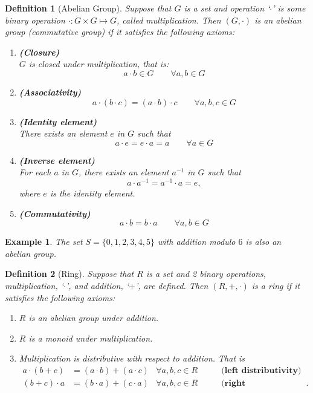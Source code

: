 \documentclass[12pt]{article}
\newtheorem{example}{Example}
\newtheorem{definition}{Definition}
\begin{document}
\begin{definition}[Abelian Group]
	Suppose that $G$ is a set and operation `$\cdot$'  is some binary operation $\cdot : G \times G \mapsto G$, called multiplication. Then $(G,\cdot)$ is an abelian group (commutative group) if it satisfies the following axioms:
	\begin{enumerate}
		\item \textbf{(Closure)}\\
		$G$ is closed under multiplication, that is:
		$$a\cdot b \in G\qquad \forall a,b\in G$$
		\item \textbf{ (Associativity) }\\
		$$a\cdot \left(b\cdot c\right) =  \left(a\cdot b\right) \cdot c \qquad \forall a,b,c\in G$$
		\item \textbf{ (Identity element) }\\
		There exists an element $e$ in $G$ such that
		$$a\cdot e = e \cdot a = a \qquad \forall a \in G$$
		\item  \textbf{(Inverse element)}\\
		For each $a$ in $G$, there exists an element $a^{-1}$ in $G$ such that 
		$$a\cdot a^{-1} = a^{-1} \cdot a = e,$$ where $e$ is the identity element.
		\item  \textbf{(Commutativity)}\\
		$$a\cdot b = b \cdot a \qquad \forall a,b \in G$$
	\end{enumerate}
\end{definition}

\begin{example}
	The set $S=\{0, 1, 2, 3, 4, 5\}$ with addition modulo $6$ is also an abelian group.
\end{example}




\begin{definition}[Ring]
	Suppose that $R$ is a set and 2 binary operations, multiplication, `$\cdot$', and addition, `$+$', are defined. Then $(R, +, \cdot)$ is a ring if it satisfies the following axioms:
	\begin{enumerate}
		\item $R$ is an abelian group under addition.
		\item $R$ is a monoid  under multiplication.
		\item Multiplication is {distributive} with respect to addition. That is
		\begin{align*}
			a \cdot (b + c) &= (a \cdot b) + (a \cdot c) &\forall a, b, c \in R  \qquad &\mathrm{\textbf{(left distributivity)}} \\
			(b + c) \cdot a &= (b \cdot a) + (c \cdot a) &\forall a, b, c \in R  \qquad &\mathrm{\textbf{(right distributivity)}}.
		\end{align*}
	\end{enumerate}
\end{definition}
\end{document}
